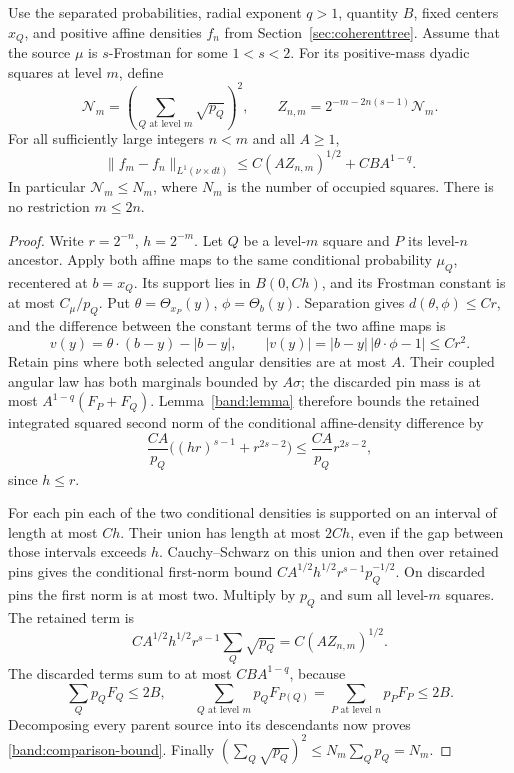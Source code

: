\begin{proposition}
\label{band:comparison}
Use the separated probabilities, radial exponent \(q>1\), quantity
\(B\), fixed centers \(x_Q\), and positive affine densities \(f_n\)
from Section~\ref{sec:coherenttree}. Assume that the source \(\mu\) is
\(s\)-Frostman for some \(1<s<2\). For its positive-mass dyadic squares
at level \(m\), define
$$
\mathcal N_m=\left(\sum_{Q\text{ at level }m}\sqrt{p_Q}\right)^2,
\qquad
Z_{n,m}=2^{-m-2n(s-1)}\mathcal N_m.
$$
For all sufficiently large integers \(n<m\) and all \(A\geq1\),
\begin{equation}\label{band:comparison-bound}
\|f_m-f_n\|_{L^1(\nu\times dt)}
\leq C(AZ_{n,m})^{1/2}+CB A^{1-q}.
\end{equation}
In particular \(\mathcal N_m\leq N_m\), where \(N_m\) is the number of
occupied squares. There is no restriction \(m\leq2n\).
\end{proposition}
\begin{proof}
Write \(r=2^{-n}\), \(h=2^{-m}\). Let \(Q\) be a level-\(m\) square
and \(P\) its level-\(n\) ancestor. Apply both affine maps to the same
conditional probability \(\mu_Q\), recentered at \(b=x_Q\). Its support
lies in \(B(0,Ch)\), and its Frostman constant is at most \(C_\mu/p_Q\).
Put \(\theta=\Theta_{x_P}(y)\), \(\phi=\Theta_b(y)\). Separation gives
\(d(\theta,\phi)\leq Cr\), and the difference between the constant
terms of the two affine maps is
$$
v(y)=\theta\cdot(b-y)-|b-y|,
\qquad |v(y)|=|b-y|\,|\theta\cdot\phi-1|\leq Cr^2.
$$
Retain pins where both selected angular densities are at most \(A\).
Their coupled angular law has both marginals bounded by \(A\sigma\);
the discarded pin mass is at most \(A^{1-q}(F_P+F_Q)\).
Lemma~\ref{band:lemma} therefore bounds the retained integrated squared
second norm of the conditional affine-density difference by
$$
\frac{CA}{p_Q}\bigl((hr)^{s-1}+r^{2s-2}\bigr)
\leq \frac{CA}{p_Q}r^{2s-2},
$$
since \(h\leq r\).

For each pin each of the two conditional densities is supported on an
interval of length at most \(Ch\). Their union has length at most
\(2Ch\), even if the gap between those intervals exceeds \(h\).
Cauchy--Schwarz on this union and then over retained pins gives the
conditional first-norm bound
\(CA^{1/2}h^{1/2}r^{s-1}p_Q^{-1/2}\).
On discarded pins the first norm is at most two. Multiply by \(p_Q\)
and sum all level-\(m\) squares. The retained term is
$$
CA^{1/2}h^{1/2}r^{s-1}\sum_Q\sqrt{p_Q}
=C(AZ_{n,m})^{1/2}.
$$
The discarded terms sum to at most \(CB A^{1-q}\), because
$$
\sum_Qp_QF_Q\leq2B,
\qquad
\sum_{Q\text{ at level }m}p_QF_{P(Q)}
=\sum_{P\text{ at level }n}p_PF_P\leq2B.
$$
Decomposing every parent source into its descendants now proves
\eqref{band:comparison-bound}. Finally
\((\sum_Q\sqrt{p_Q})^2\leq N_m\sum_Qp_Q=N_m\).
\end{proof}

